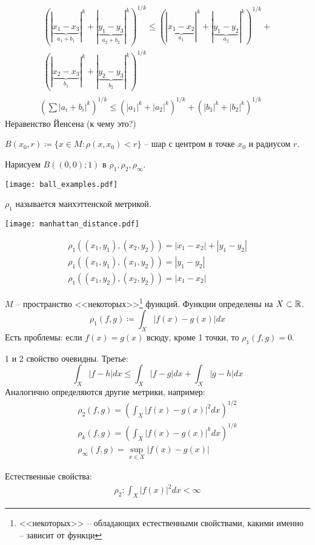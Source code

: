 \documentclass[main]{subfiles}
\begin{document}
\begin{gather*}
    \begin{multlined}
        \left(|\underbrace{x_1-x_3}_{a_1+b_1}|^k + |\underbrace{y_1-y_3}_{a_2+b_2}|^k\right)^{1/k} \le
        \left(|\underbrace{x_1-x_2}_{a_1}|^k + |\underbrace{y_1-y_2}_{a_2}|^k\right)^{1/k}+\\
        \left(|\underbrace{x_2-x_3}_{b_1}|^k + |\underbrace{y_2-y_3}_{b_2}|^k\right)^{1/k}
    \end{multlined}\\
    \left(\sum|a_i+b_i|^k\right)^{1/k} \le \left(|a_1|^k + |a_2|^k\right)^{1/k} + \left(|b_1|^k + |b_2|^k\right)^{1/k}
\end{gather*}
Неравенство Йенсена (к чему это?)

\begin{definition}
    $B(x_0, r)\coloneqq\{x\in M : \rho(x,x_0) < r\}$ -- шар с центром в точке $x_0$ и радиусом $r$.
\end{definition}

Нарисуем $B((0,0);1)$ в $\rho_1, \rho_2, \rho_\infty.$

\begin{center}
    \texttt{[image: ball\_examples.pdf]}
\end{center}

\begin{minipage}{0.45\textwidth}
    $\rho_1$ называется манхэттенской метрикой.
\end{minipage}
\begin{minipage}{0.45\textwidth}
    \texttt{[image: manhattan\_distance.pdf]}
\end{minipage}
\begin{gather*}
    \rho_1((x_1, y_1), (x_2, y_2)) = |x_1 - x_2| + |y_1 - y_2|\\
    \rho_1((x_1, y_1), (x_1, y_2)) = |y_1 - y_2|\\
    \rho_1((x_1, y_2), (x_2, y_2)) = |x_1 - x_2|
\end{gather*}

\begin{example}
    $M$ --  пространство <<некоторых>>\footnote{<<некоторых>> -- обладающих естественными свойствами, какими именно -- зависит от функци}
    функций. Функции определены на $X\subset \mathbb{R}$.
    \[\rho_1(f,g) \coloneqq \int_X |f(x)-g(x)| dx\]
    Есть проблемы: если $f(x)=g(x)$ всюду, кроме 1 точки, то $\rho_1(f,g)=0$.

    1 и 2 свойство очевидны. Третье:
    \[\int_X |f-h| dx \le \int_X|f-g|dx + \int_X |g-h|dx\]
    Аналогично определяются другие метрики, например:
    \begin{gather*}
        \rho_2(f,g) = \left(\int_X |f(x)-g(x)|^2 dx\right)^{1/2}\\
        \rho_k(f,g) = \left(\int_X |f(x)-g(x)|^k dx\right)^{1/k}\\
        \rho_\infty(f,g) = \sup_{x\in X} |f(x)-g(x)|
    \end{gather*}

    Естественные свойства:
    \begin{gather*}
        \rho_2: \int_X |f(x)|^2 dx < \infty
    \end{gather*}
\end{example}
\end{document}
